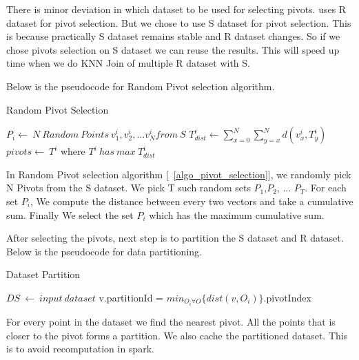 There is minor deviation in which dataset to be used for selecting
pivots. \cite{lu_efficient_2012} uses R dataset for pivot
selection. But we chose to use S dataset for pivot selection. This is
because practically S dataset remains stable and R dataset changes. So
if we chose pivots selection on S dataset we can reuse the
results. This will speed up time when we do KNN Join of multiple R
dataset with S.

\medskip

Below is the pseudocode for Random Pivot selection algorithm.

\begin{algorithm}
  \caption{Random Pivot Selection}
  \label{algo_pivot_selection}
  \begin{algorithmic}[1]
    \STATE $P_i  \leftarrow \ N\ Random\ Points\ v^i_1,v^i_2,...v^i_N  from\ S$
    \STATE $T_{dist}^i \leftarrow \sum\limits_{x=0}^N\sum\limits_{y=x}^N d(v^i_x, T^i_y)$
    \ENDFOR
    \STATE $pivots \leftarrow\ T^i$ where $T^i\ has\ max\ T^i_{dist}$
  \end{algorithmic}
\end{algorithm}


In Random Pivot selection algorithm [~\ref{algo_pivot_selection}], we randomly pick N Pivots from the
S dataset. We pick T such random sets {$P_1$,$P_2$, ... $P_T$}. For each set $P_i$, We
compute the distance between every two
vectors and take a cumulative sum. Finally We select the set $P_i$
which has the maximum cumulative sum.

\bigskip

After selecting the pivots, next step is to partition the S dataset
and R dataset. Below is the pseudocode for data partitioning.

\begin{algorithm}
  \caption{Dataset Partition}
  \label{algo_dataset_partition}
  \begin{algorithmic}[1]
    \STATE $DS\ \leftarrow\ input\ dataset$
    \STATE v.partitionId = $min_{O_i \forall O}\{dist(v, O_i)\}$.pivotIndex
    \ENDFOR
  \end{algorithmic}
\end{algorithm}


For every point in the dataset we find the nearest pivot. All
the points that is closer to the pivot forms a partition. We also
cache the partitioned dataset. This is to avoid recomputation in
spark.


